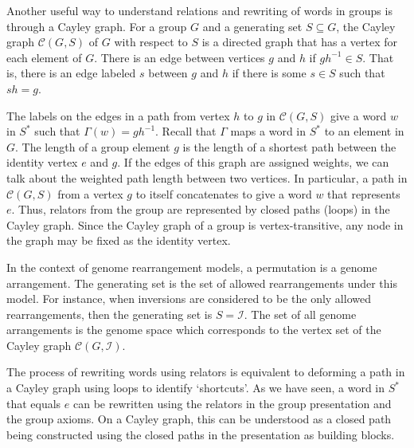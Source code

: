 \documentclass[utf8]{Frontiers_LaTex_Templates/frontiersFPHY} %
\newcommand{\invset}{\mathcal{I}}
\newcommand{\id}{e}
\newcommand{\cayley}{\mathcal{C}}
\numberwithin{equation}{section}
\begin{document}
Another useful way to understand relations and rewriting of words in groups is through a Cayley graph. For a group $G$ and a generating set $S \subseteq G$, the Cayley graph $\cayley(G,S)$ of $G$ with respect to $S$ is a directed graph that has a vertex for each element of $G$.  There is an edge between vertices $g$ and $h$ if $gh^{-1} \in S$. That is, there is an edge labeled $s$ between $g$ and $h$ if there is some $s \in S$ such that $sh = g$. 

The labels on the edges in a path from vertex $h$ to $g$ in $\cayley(G,S)$ give a word $w$ in $S^*$ such that $\Gamma(w) = gh^{-1}$. Recall that $\Gamma$ maps a word in $S^*$ to an element in $G$. The length of a group element $g$ is the length of a shortest path between the identity vertex $\id$ and $g$. If the edges of this graph are assigned weights, we can talk about the weighted path length between two vertices. 
In particular, a path in $\cayley(G,S)$ from a vertex $g$ to itself concatenates to give a word $w$ that represents $\id$.
Thus, relators from the group are represented by closed paths (loops) in the Cayley graph.
Since the Cayley graph of a group is vertex-transitive, any node in the graph may be fixed as the identity vertex.


In the context of genome rearrangement models, a permutation is a genome arrangement. The generating set is the set of allowed rearrangements under this model. For instance, when inversions are considered to be the only allowed rearrangements, then the generating set is $S=\invset$. The set of all genome arrangements is the genome space which corresponds to the vertex set of the Cayley graph $\cayley(G, \invset)$. 


The process of rewriting words using relators is equivalent to deforming a path in a Cayley graph using loops to identify `shortcuts'. As we have seen, a word in $S^*$ that equals $\id$ can be rewritten using the relators in the group presentation and the group axioms. On a Cayley graph, this can be understood as a closed path being constructed using the closed paths in the presentation as building blocks.
\end{document}
